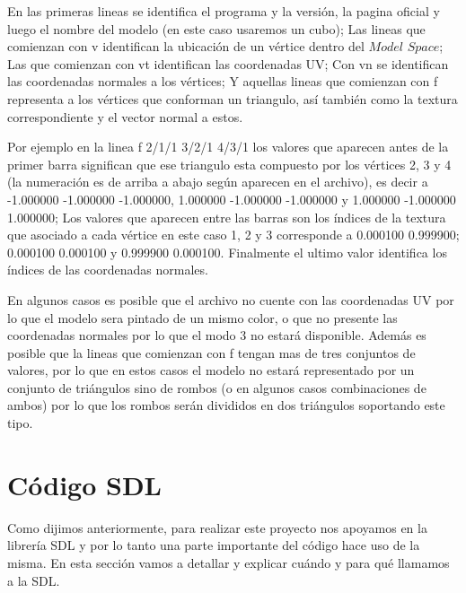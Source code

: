 \documentclass[a4paper]{article}
\newcounter{col}
\begin{document}
En las primeras lineas se identifica el programa y la versión, la pagina oficial y luego el nombre del modelo (en este caso usaremos un cubo); Las lineas que comienzan con v identifican la ubicación de un vértice dentro del $Model$ $Space$; Las que comienzan con vt identifican las coordenadas UV; Con vn se identifican las coordenadas normales a los vértices; Y aquellas lineas que comienzan con f representa a los vértices que conforman un triangulo, así también como la textura correspondiente y el vector normal a estos.
\par Por ejemplo en la linea f 2/1/1 3/2/1 4/3/1 los valores que aparecen antes de la primer barra significan que ese triangulo esta compuesto por los vértices 2, 3 y 4 (la numeración es de arriba a abajo según aparecen en el archivo), es decir a -1.000000 -1.000000 -1.000000, 1.000000 -1.000000 -1.000000 y 1.000000 -1.000000 1.000000; Los valores que aparecen entre las barras son los índices de la textura que asociado a cada vértice en este caso 1, 2 y 3 corresponde a 0.000100 0.999900; 0.000100 0.000100 y 0.999900 0.000100. Finalmente el ultimo valor identifica los índices de las coordenadas normales.
\par En algunos casos es posible que el archivo no cuente con las coordenadas UV por lo que el modelo sera pintado de un mismo color, o que no presente las coordenadas normales por lo que el modo 3 no estará disponible. Además es posible que la lineas que comienzan con f tengan mas de tres conjuntos de valores, por lo que en estos casos el modelo no estará representado por un conjunto de triángulos sino de rombos (o en algunos casos combinaciones de ambos) por lo que los rombos serán divididos en dos triángulos soportando este tipo. 


\section{Código SDL}
Como dijimos anteriormente, para realizar este proyecto nos apoyamos en la librería SDL y por lo tanto una parte importante del código hace uso de la misma. En esta sección vamos a detallar y explicar cuándo y para qué llamamos a la SDL.
\end{document}

